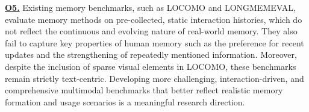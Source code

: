 \noindent {} \textbf{\underline{O5.}}
Existing memory benchmarks, such as LOCOMO and LONGMEMEVAL, evaluate memory methods on pre-collected, static interaction histories, which do not reflect the continuous and evolving nature of real-world memory. They also fail to capture key properties of human memory such as the preference for recent updates and the strengthening of repeatedly mentioned information. Moreover, despite the inclusion of sparse visual elements in LOCOMO, these benchmarks remain strictly text-centric. Developing more challenging, interaction-driven, and comprehensive multimodal benchmarks that better reflect realistic memory formation and usage scenarios is a meaningful research direction.


